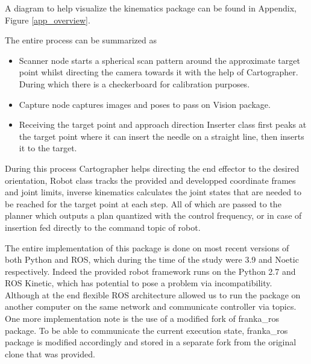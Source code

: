 A diagram to help visualize the kinematics package can be found in Appendix, Figure \ref{app_overview}.

The entire process can be summarized as
\begin{itemize}
    \item Scanner node starts a spherical scan pattern around the approximate target point whilst directing the camera towards it with the help of Cartographer. During which there is a checkerboard for calibration purposes.
    \item Capture node captures images and poses to pass on Vision package.
    \item Receiving the target point and approach direction Inserter class first peaks at the target point where it can insert the needle on a straight line, then inserts it to the target.
\end{itemize}
During this process Cartographer helps directing the end effector to the desired orientation, Robot class tracks the provided and developped coordinate frames and joint limits, inverse kinematics  calculates the joint states that are needed to be reached for the target point at each step. All of which are passed to the planner which outputs a plan quantized with the control frequency, or in case of insertion fed directly to the command topic of robot.


The entire implementation of this package is done on most recent versions of both Python and ROS, which during the time of the study were 3.9 and Noetic respectively.
Indeed the provided robot framework runs on the Python 2.7 and ROS Kinetic, which has potential to pose a problem via incompatibility.
Although at the end flexible ROS architecture allowed us to run the package on another computer on the same network and communicate controller via topics.
One more implementation note is the use of a modified fork of franka\_ros package.
To be able to communicate the current execution state, franka\_ros package is modified accordingly and stored in a separate fork from the original clone that was provided.